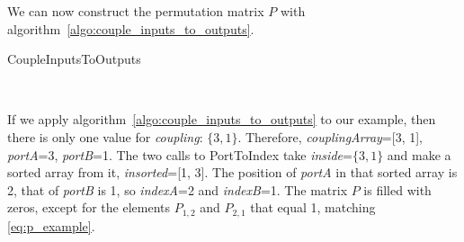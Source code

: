 We can now construct the permutation matrix $P$ with algorithm~\cref{algo:couple_inputs_to_outputs}.
\begin{algorithm}
    \caption{CoupleInputsToOutputs}
    \label{algo:couple_inputs_to_outputs}
    \begin{algorithmic}
         
        \EndFor
        \\ 
        \EndFunction
    \end{algorithmic}
\end{algorithm}

If we apply algorithm~\cref{algo:couple_inputs_to_outputs} to our example, then there is only one value for \textit{coupling}: $\lbrace 3, 1\rbrace$.
Therefore, \textit{couplingArray}=[3, 1], \textit{portA}=3, \textit{portB}=1.
The two calls to PortToIndex take \textit{inside}=$\lbrace 3, 1\rbrace$ and make a sorted array from it, \textit{insorted}=[1, 3].
The position of \textit{portA} in that sorted array is 2, that of \textit{portB} is 1, so \textit{indexA}=2 and \textit{indexB}=1.
The matrix $P$ is filled with zeros, except for the elements $P_{1, 2}$ and $P_{2, 1}$ that equal 1, matching \cref{eq:p_example}.

